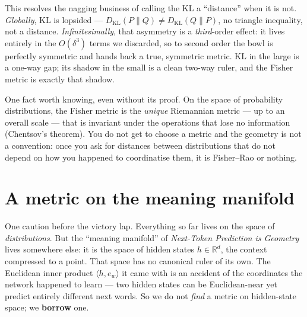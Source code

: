 \documentclass[11pt]{article}
\begin{document}
\begin{insight}
This resolves the nagging business of calling the KL a ``distance'' when it is not.
\emph{Globally}, KL is lopsided --- $D_{\mathrm{KL}}(P\|Q) \ne D_{\mathrm{KL}}(Q\|P)$, no triangle
inequality, not a distance. \emph{Infinitesimally}, that asymmetry is a \emph{third}-order effect:
it lives entirely in the $O(\delta^3)$ terms we discarded, so to second order the bowl is
perfectly symmetric and hands back a true, symmetric metric. KL in the large is a one-way gap;
its shadow in the small is a clean two-way ruler, and the Fisher metric is exactly that shadow.
\end{insight}

\begin{insight}
One fact worth knowing, even without its proof. On the space of probability distributions, the
Fisher metric is the \emph{unique} Riemannian metric --- up to an overall scale --- that is
invariant under the operations that lose no information (Chentsov's theorem). You do not get to
choose a metric and the geometry is not a convention: once you ask for distances between
distributions that do not depend on how you happened to coordinatise them, it is Fisher--Rao or
nothing.
\end{insight}

\section{A metric on the meaning manifold}

One caution before the victory lap. Everything so far lives on the space of
\emph{distributions}. But the ``meaning manifold'' of \emph{Next-Token Prediction is Geometry}
lives somewhere else: it is the space of hidden states $h \in \mathbb{R}^d$, the context
compressed to a point. That space has no canonical ruler of its own. The Euclidean inner product
$\langle h, e_w\rangle$ it came with is an accident of the coordinates the network happened to
learn --- two hidden states can be Euclidean-near yet predict entirely different next words. So we
do not \emph{find} a metric on hidden-state space; we \textbf{borrow} one.
\end{document}
